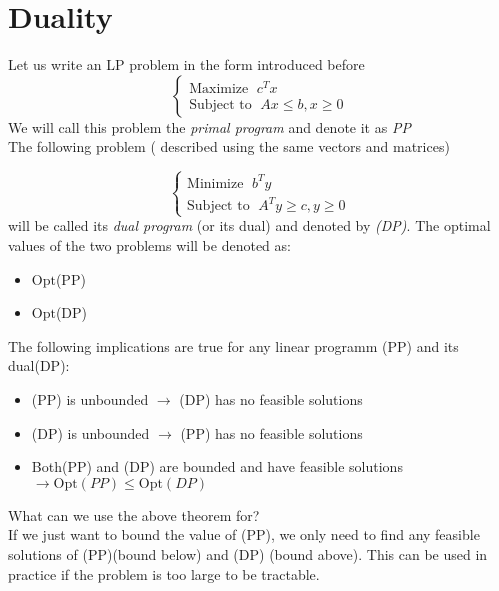 \chapter{Duality}
{
    Let us write an LP problem in the form introduced before
    \begin{equation}
        \begin{cases}
        \text{Maximize  }\; c^{T}x\\
        \text{Subject to  }\; Ax\le b, x \ge 0  
        \end{cases}
    \end{equation}
    We will call this problem the \textit{primal program} and denote it as \textit{PP}\\
    The following problem ( described using the same vectors and matrices)

    \begin{equation}
        \begin{cases}
        \text{Minimize  }\; b^{T}y\\
        \text{Subject to  }\; A^{T}y\ge c, y \ge 0  
        \end{cases}
    \end{equation}
    will be called its \textit{dual program} (or its dual) and denoted by \textit{(DP)}. The optimal values of the two problems will be denoted as:
    \begin{itemize}
        \item $\text{Opt}$(PP)
        \item $\text{Opt}$(DP)
    \end{itemize}
}

{
    The following implications are true for any linear programm (PP) and its dual(DP):
    \begin{itemize}
        \item (PP) is unbounded $\rightarrow $ (DP) has no feasible solutions
        \item (DP) is unbounded $\rightarrow $ (PP) has no feasible solutions
        \item Both(PP) and (DP) are bounded and have feasible solutions\\
            $\rightarrow \text{Opt}(PP) \le \text{Opt}(DP)$
    \end{itemize}
    What can we use the above theorem for?\\
    If we just want to bound the value of (PP), we only need to find any feasible solutions of (PP)(bound below) and (DP) (bound above). This can be used in practice if the problem is too large to be tractable.
}

